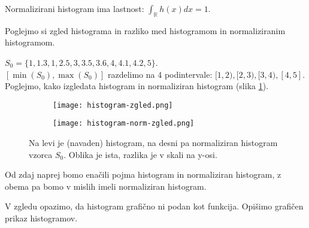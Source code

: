 \begin{opomba}
    Normalizirani histogram ima lastnost: $\int_\mathbb{R} h(x) dx = 1$.
\end{opomba}

Poglejmo si zgled histograma in razliko med histogramom in normaliziranim histogramom.

\pagebreak
\begin{zgled}
    $S_0 = \{1,1.3,1,2.5,3,3.5,3.6,4,4.1,4.2,5\}$. \\
    $[\min(S_0), \max(S_0)]$ razdelimo na 4 podintervale: $[1,2), [2,3), [3,4), [4,5]$.
    Poglejmo, kako izgledata histogram in normaliziran histogram (slika \ref{hist-zgled}).
    \begin{figure}[!h]
        \begin{subfigure}{0.49\textwidth}
            \centering
            \texttt{[image: histogram-zgled.png]}
        \end{subfigure}
        \begin{subfigure}{0.49\textwidth}
            \centering
            \texttt{[image: histogram-norm-zgled.png]}
        \end{subfigure}
        \caption{Na levi je (navaden) histogram, na desni pa normaliziran histogram vzorca $S_0$. Oblika je ista, razlika je v skali na y-osi.}
        \label{hist-zgled}
    \end{figure}
\end{zgled}

Od zdaj naprej bomo enačili pojma histogram in normaliziran histogram, z obema pa bomo v mislih imeli normaliziran histogram.

V zgledu opazimo, da histogram grafično ni podan kot funkcija. Opišimo  grafičen prikaz histogramov.
